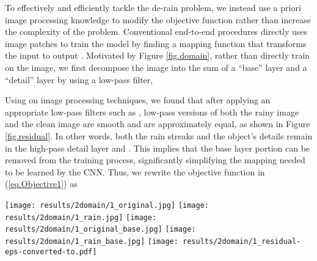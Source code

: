 \documentclass[journal]{IEEEtran}
\begin{document}
To effectively and efficiently tackle the de-rain problem, we instead use a priori image processing knowledge to modify the objective function rather than increase the complexity of the problem. Conventional end-to-end procedures directly uses image patches to train the model by finding a mapping function  that transforms the input to output \cite{15,19}. Motivated by Figure \ref{fig.domain}, rather than directly train on the image, we first decompose the image into the sum of a ``base'' layer and a ``detail'' layer by using a low-pass filter,

Using on image processing techniques, we found that after applying an appropriate low-pass filters such as \cite{23,24,25}, low-pass versions of both the rainy image  and the clean image  are smooth and are approximately equal, as shown in Figure \ref{fig.residual}. In other words, both the rain streaks and the object's details remain in the high-pass detail layer and . This implies that the base layer portion can be removed from the training process, significantly simplifying the mapping needed to be learned by the CNN. Thus, we rewrite the objective function in (\ref{eq.Objective1}) as


\begin{figure*}[tp!]
\begin{center}
\texttt{[image: results/2domain/1\_original.jpg]}
\texttt{[image: results/2domain/1\_rain.jpg]}
\texttt{[image: results/2domain/1\_original\_base.jpg]}
\texttt{[image: results/2domain/1\_rain\_base.jpg]}
\texttt{[image: results/2domain/1\_residual-eps-converted-to.pdf]}  \\

\caption{Example base and detail layers of two synthesized images. We use the guided filtering \cite{23} as the low-pass filter to generate the results.} \label{fig.residual}
\end{center}
\end{figure*}
\end{document}
